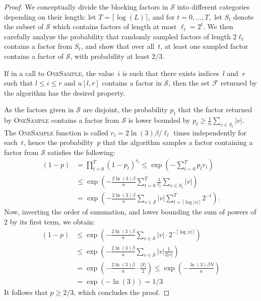 \documentclass[letterpaper, USenglish, cleveref, autoref, thm-restate, numberwithinsect]{lipics-v2021}
\theoremstyle{theorem}
\theoremstyle{definition}
\newcommand{\Ff}{\mathcal{F}}
\newcommand{\Ss}{\mathcal{S}}
\begin{document}
\begin{proof}
    We conceptually divide the blocking factors in $\Ss$ into different categories depending on their length:
    let $T = \lceil\log(L)\rceil$, and for $t= 0,\ldots, T,$ let $S_t$ denote the subset of $\Ss$ which contains factors of length at most $\ell_t = 2^t$.
    We then carefully analyze the probability that randomly sampled factors of length $2\ell_t$ contains a factor
    from $S_{t}$, and show that over all~$t$, at least one sampled factor contains a factor of $\Ss$, with probability at least $2/3$.
    
    \begin{claim}
        If in a call to \textsc{OneSample}, the value~$i$ is such that there exists indices~$l$ and~$r$ such that $l \le i\le r$
        and $u[l, r]$ contains a factor in $\Ss$, then the set $\Ff$ returned by the algorithm has the desired property.
    \end{claim}
    
    As the factors given in $\Ss$ are disjoint,
    the probability $p_t$ that the factor returned by \textsc{OneSample} contains a factor from $\Ss$ is lower bounded by
    \(p_t \ge \frac{1}{n}\sum_{v\in S_t} |v|.\)
    The \textsc{OneSample} function is called $r_t = 2\ln(3)\beta/\ell_t$ times independently for each~$t$,
    hence the probability~$p$ that the algorithm samples a factor containing a factor from $\Ss$ satisfies the following:
    \begin{align*}
        (1-p) 
        &= \prod_{t=0}^T (1-p_t)^{r_t} \le \exp\left(-\sum_{t=0}^T p_t r_t\right)\\
        &\le \exp\left(-\frac{2\ln(3)\beta}{n} \sum_{t=0}^T \frac{1}{\ell_t} \sum_{v\in S_t} |v|\right)\\
        &= \exp\left(-\frac{2\ln(3)\beta}{n} \sum_{v\in \Ss}|v| \sum_{t=\lceil\log|v|\rceil}^T 2^{-t}\right).
    \end{align*}
    Now, inverting the order of summation, and lower bounding the sum of powers of $2$ by its first term,
    we obtain:
    \begin{align*}
        (1-p) &\le \exp\left(-\frac{2\ln(3)\beta}{n} \sum_{v\in \Ss}|v| \cdot 2^{-\lceil\log|v|\rceil}\right)\\
        &\le \exp\left(-\frac{2\ln(3)\beta}{n} \sum_{v\in \Ss}|v| \frac{1}{2|v|}\right)\\
        &= \exp\left(-\frac{2\ln(3)\beta}{n} \cdot\frac{|\Ss|}{2}\right) 
         \le \exp\left(-\frac{\ln(3)\beta N}{n}\right)\\
        &= \exp\left(-\ln(3) \right) = 1/3
    \end{align*}
    It follows that $p \ge 2/3$, which concludes the proof.
\end{proof}
\end{document}
